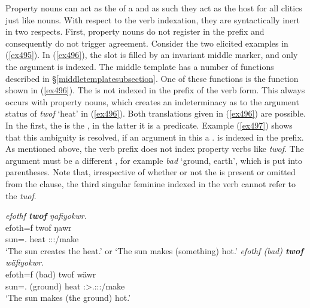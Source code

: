 Property nouns can act as the  of a  and as such they act as the host for all  clitics just like nouns. With respect to the verb indexation, they are syntactically inert in two respects. First, property nouns do not register in the  prefix and consequently do not trigger  agreement. Consider the two elicited examples in (\ref{ex495}). In (\ref{ex496}), the  slot is filled by an invariant middle marker, and only the  argument is indexed. The middle template has a number of functions described in \S{}\ref{middletemplatesubsection}. One of these functions is the  function shown in (\ref{ex496}). The  is not indexed in the  prefix of the verb form. This always occurs with property nouns, which creates an indeterminacy as to the argument status of \emph{twof} `heat' in (\ref{ex496}). Both translations given in (\ref{ex496}) are possible. In the first, the  is the , in the latter it is a  predicate. Example (\ref{ex497}) shows that this ambiguity is resolved, if an argument \textendash{} in this  a \Tsg.\F{} \textendash{} is indexed in the prefix. As mentioned above, the verb prefix does not index property verbs like \emph{twof}. The  argument must be a different , for example \emph{bad} `ground, earth', which is put into parentheses. Note that, irrespective of whether or not the   is present or omitted from the clause, the third singular feminine indexed in the verb cannot refer to the  \emph{tuof}.

\begin{exe}
	\ex \label{ex495}
	\begin{xlist}
	\ex \emph{efothf \textbf{twof} ŋafiyokwr.}\\
	\gll efoth=f twof ŋawr\\
	sun=\Erg.\Sg{} heat \Stsg:\Sbj:\Nonpast:\Ipfv/make\\
	\trans `The sun creates the heat.' or `The sun makes (something) hot.'
	\label{ex496}
	\ex \emph{efothf (bad) \textbf{twof} wäfiyokwr.}\\
	\gll efoth=f (bad) twof wäwr\\
	sun=\Erg.\Sg{} (ground) heat \Stsg:\Sbj>\Tsg.\F:\Obj:\Nonpast:\Ipfv/make\\
	\trans `The sun makes (the ground) hot.'
	\label{ex497}
	\end{xlist}
\end{exe}

